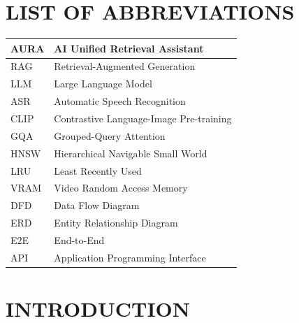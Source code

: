 \documentclass[12pt,a4paper]{report}
\begin{document}
\chapter*{LIST OF ABBREVIATIONS}
\noindent
\begin{longtable}{|p{3cm}|p{10.5cm}|}
\hline
AURA & AI Unified Retrieval Assistant \\ \hline
RAG & Retrieval-Augmented Generation \\ \hline
LLM & Large Language Model \\ \hline
ASR & Automatic Speech Recognition \\ \hline
CLIP & Contrastive Language-Image Pre-training \\ \hline
GQA & Grouped-Query Attention \\ \hline
HNSW & Hierarchical Navigable Small World \\ \hline
LRU & Least Recently Used \\ \hline
VRAM & Video Random Access Memory \\ \hline
DFD & Data Flow Diagram \\ \hline
ERD & Entity Relationship Diagram \\ \hline
E2E & End-to-End \\ \hline
API & Application Programming Interface \\ \hline
\end{longtable}

\clearpage
{}
\setcounter{page}{1}

\titlespacing*{\chapter}{0pt}{12pt}{10pt}


\chapter{INTRODUCTION}
\label{ch:introduction}
\end{document}
